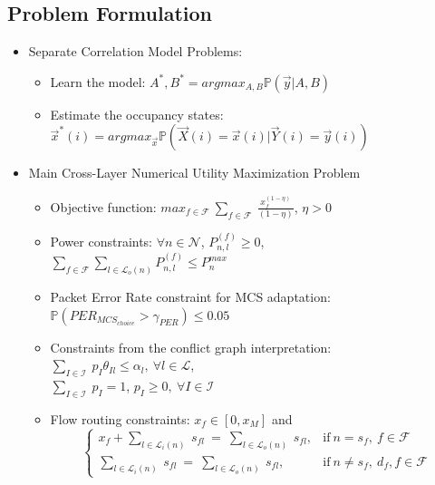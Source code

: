 \documentclass[12pt, draftcls, onecolumn]{IEEEtran}
\begin{document}
\subsection{Problem Formulation}
\begin{itemize}
        \item Separate Correlation Model Problems:
        \begin{itemize}
            \item Learn the model:
            $A^*, B^* = argmax_{A, B} \mathbb{P}(\vec{y} | A, B)$
            \item Estimate the occupancy states: 
            $\Vec{x}^*(i) = argmax_{\Vec{x}} \mathbb{P}(\Vec{X}(i)=\Vec{x}(i)|\Vec{Y}(i)=\Vec{y}(i))$
        \end{itemize}
        \item Main Cross-Layer Numerical Utility Maximization Problem
        \begin{itemize}
            \item Objective function: $max_{f \in \mathcal{F}}\ \sum_{f \in \mathcal{F}}\ \frac{x_f^{(1-\eta)}}{(1-\eta)}$, $\eta > 0$
            \item Power constraints: $\forall n \in \mathcal{N}$, 
            $P_{n, l}^{(f)} \geq 0$, 
            \\$\sum_{f \in \mathcal{F}}\sum_{l \in \mathcal{L}_o(n)}P_{n,l}^{(f)} \leq P_n^{max}$
            \item Packet Error Rate constraint for MCS adaptation: $\mathbb{P}(PER_{MCS_{choice}} > \gamma_{PER}) \leq 0.05$
            \item Constraints from the conflict graph interpretation: $\sum_{I \in \mathcal{I}}\ p_I \theta_{Il} \leq \alpha_l,\ \forall l \in \mathcal{L}$, 
            \\$\sum_{I \in \mathcal{I}}\ p_I = 1$, $p_I \geq 0,\ \forall I \in \mathcal{I}$
            \item Flow routing constraints: $x_f \in [0,x_M]$ and
            \begin{equation*}
                \begin{cases}
                    x_f + \sum_{l \in \mathcal{L}_i(n)}\ s_{fl}\ =\ \sum_{l \in \mathcal{L}_o(n)}\ s_{fl}, & \text{if}\ n=s_{f},\ f \in \mathcal{F}\\
                    \sum_{l \in \mathcal{L}_i(n)}\ s_{fl}\ =\ \sum_{l \in \mathcal{L}_o(n)}\ s_{fl}, & \text{if}\ n\not=s_{f},\ d_f, f \in \mathcal{F}
                \end{cases}
            \end{equation*}
        \end{itemize}
    \end{itemize}
\end{document}
